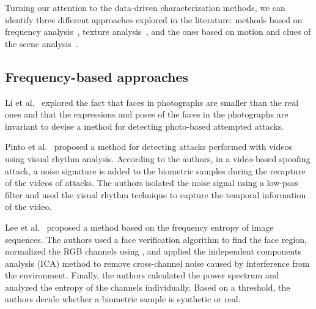 Turning our attention to the data-driven characterization methods, we can identify three different approaches explored in the literature: methods based on frequency analysis~\cite{Li:BTHI:2004, Pinto:SIBGRAPI:2012, Lee:ICASSP:2013}, texture analysis~\cite{Tan:ECCV:2010, Peixoto:ICIP:2011, Maatta:IJCB:2011, Schwartz:IJCB:2011, Maatta:IET:2012, Kim:ICB:2012, Komulainen:ACCV:2012}, and the ones based on motion and clues of the scene analysis~\cite{Tronci:IJCB:2011, Chingovska:BIOSEG:2012, Yan:ICARCV:2012, Zhang:ICB:2012, Anjos:IJCB:2011}. 



\subsection{Frequency-based approaches}
Li et al.~\cite{Li:BTHI:2004} explored the fact that faces in photographs are smaller than the real ones and that the expressions and poses of the faces in the photographs are invariant to devise a method for detecting photo-based attempted attacks. 

Pinto et al.~\cite{Pinto:SIBGRAPI:2012} proposed a method for detecting attacks performed with videos using visual rhythm analysis. According to the authors, in a video-based spoofing attack, a noise signature is added to the biometric samples during the recapture of the videos of attacks. The authors isolated the noise signal using a low-pass filter  and used the visual rhythm technique to capture the temporal information of the video.

Lee et al.~\cite{Lee:ICASSP:2013} proposed a method based on the frequency entropy of image sequences. The authors used a face verification algorithm to find the face region, normalized the RGB channels using , and applied the independent components analysis (ICA) method to remove cross-channel noise caused by interference from the environment. Finally, the authors calculated the power spectrum and analyzed the entropy of the channels individually. Based on a threshold, the authors decide whether a biometric sample is synthetic or real.

